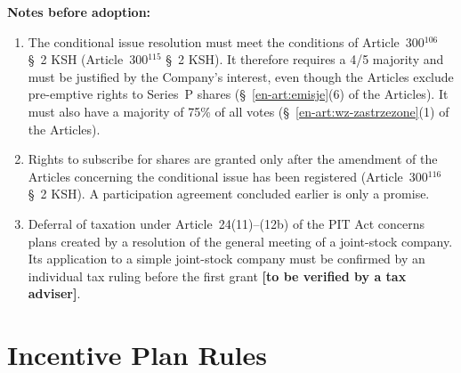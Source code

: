 \documentclass[11pt,a4paper]{report}
\newcommand{\field}[1]{\textbf{[#1]}}
\newcommand{\US}[1]{\S~#1 of the Articles}
\begin{document}
\textbf{Notes before adoption:}
\begin{enumerate}
  \item The conditional issue resolution must meet the conditions of Article~300$^{106}$ \S~2 KSH (Article~300$^{115}$ \S~2 KSH). It therefore requires a 4/5 majority and must be justified by the Company's interest, even though the Articles exclude pre-emptive rights to Series~P shares (\US{\ref{en-art:emisje}(6)}). It must also have a majority of 75\% of all votes (\US{\ref{en-art:wz-zastrzezone}(1)}).
  \item Rights to subscribe for shares are granted only after the amendment of the Articles concerning the conditional issue has been registered (Article~300$^{116}$ \S~2 KSH). A participation agreement concluded earlier is only a promise.
  \item Deferral of taxation under Article~24(11)--(12b) of the PIT Act concerns plans created by a resolution of the general meeting of a joint-stock company. Its application to a simple joint-stock company must be confirmed by an individual tax ruling before the first grant \field{to be verified by a tax adviser}.
\end{enumerate}

\chapter*{Incentive Plan Rules}
\end{document}
